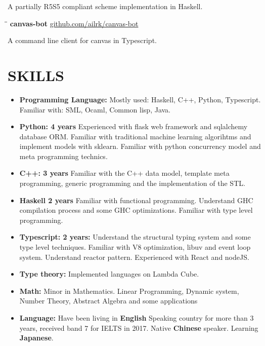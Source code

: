 \documentclass{res}
\begin{document}
\begin{resume}
\begin{tabbing}
    \end{tabbing}\vspace{-30pt}
    A partially R5S5 compliant scheme implementation in Haskell.

    \vspace{-0.2in}
    \begin{tabbing}
        \hspace{2.4in}\= \hspace{0.9in}\= \kill
        {\bf canvas-bot} \>               \>\url{github.com/ailrk/canvas-bot}\\

    \end{tabbing}\vspace{-30pt}
    A command line client for canvas in Typescript.

\section{SKILLS}
    \begin{itemize}[leftmargin=-.2in]
        \setlength\itemsep{-1em}
        \item \textbf{Programming Language:} Mostly used: Haskell, C++, Python, Typescript. Familiar with: SML, Ocaml, Common lisp, Java. \\
        \item \textbf{Python: 4 years}
          Experienced with flask web framework and sqlalchemy database ORM.
          Familiar with traditional machine learning algorihtms and implement models with sklearn.
          Familiar with python concurrency model and meta programming technics. \\
        \item \textbf{C++: 3 years}
          Familiar with the C++ data model, template meta programming,
          generic programming and the implementation of the STL. \\
        \item \textbf{Haskell 2 years}
          Familiar with functional programming.
          Understand GHC compilation process and some GHC optimizations.
          Familiar with type level programming.\\
        \item \textbf{Typescript: 2 years:} Understand the structural typing system and some type level techniques. Familiar with V8 optimization, libuv and event loop system. Understand reactor pattern. Experienced with React and nodeJS. \\
        \item \textbf{Type theory:} Implemented languages on Lambda Cube. \\
        \item \textbf{Math:} Minor in Mathematics. Linear Programming, Dynamic system, Number Theory, Abstract Algebra and some applications \\
        \item \textbf{Language:} Have been living in \textbf{English} Speaking country for more than 3 years, received band 7 for IELTS in 2017. Native \textbf{Chinese} speaker. Learning \textbf{Japanese}.
    \end{itemize}

\end{resume}
\end{document}
